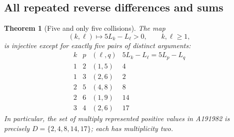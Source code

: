 \documentclass[11pt]{article}
\newtheorem{theorem}{Theorem}[section]
\begin{document}
\subsection{All repeated reverse differences and sums}
\begin{theorem}[Five and only five collisions]\label{oeis:thm:duplicates}
The map
\[
(k,\ell)\longmapsto 5L_k-L_\ell>0,\qquad k,\ell\ge1,
\]
is injective except for exactly five pairs of distinct arguments:
\[
\begin{array}{c|c|c|c}
k&p&(\ell,q)&5L_k-L_\ell=5L_p-L_q\\ \hline
1&2&(1,5)&4\\
1&3&(2,6)&2\\
2&5&(4,8)&8\\
2&6&(1,9)&14\\
3&4&(2,6)&17
\end{array}
\]
In particular, the set of multiply represented positive values in
A191982 is precisely $D=\{2,4,8,14,17\}$; each has multiplicity two.
\end{theorem}
\end{document}
